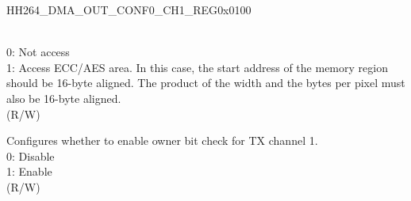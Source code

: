 \begin{register}{H}{H264\_DMA\_OUT\_CONF0\_CH1\_REG}{0x0100}
\begin{regdesc}
\begin{reglist}
    \\0: Not access
    \\1: Access ECC/AES area. In this case, the start address of the memory region should be 16-byte aligned. The product of the width and the bytes per pixel must also be 16-byte aligned.\\(R/W)
    \label{fielddesc:H264DMAOUTCHECKOWNERCH1}\item [H264\_DMA\_OUT\_CHECK\_OWNER\_CH1] Configures whether to enable owner bit check for TX channel 1.\\
    0: Disable\\
    1: Enable\\ (R/W)
    
    \item [Continued on the next page...]
    \end{reglist}\end{regdesc}
    \end{register}
    
